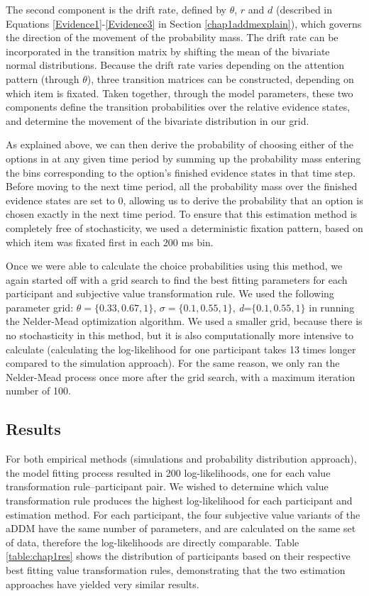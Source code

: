 \documentclass[11pt,a4paper]{article}
\begin{document}
The second component is the drift rate, defined by $\theta$, $r$ and $d$ (described in Equations \ref{Evidence1}-\ref{Evidence3} in Section \ref{chap1addmexplain}), which governs the direction of the movement of the probability mass. The drift rate can be incorporated in the transition matrix by shifting the mean of the bivariate normal distributions. Because the drift rate varies depending on the attention pattern (through $\theta$), three transition matrices can be constructed, depending on which item is fixated. Taken together, through the model parameters, these two components define the transition probabilities over the relative evidence states, and determine the movement of the bivariate distribution in our grid.  


As explained above, we can then derive the probability of choosing either of the options in at any given time period by summing up the probability mass entering the bins corresponding to the option's finished evidence states in that time step. Before moving to the next time period, all the probability mass over the finished evidence states are set to 0, allowing us to derive the probability that an option is chosen exactly in the next time period. To ensure that this estimation method is completely free of stochasticity, we used a deterministic fixation pattern, based on which item was fixated first in each 200 ms bin. 




Once we were able to calculate the choice probabilities using this method, we again started off with a grid search to find the best fitting parameters for each participant and subjective value transformation rule. We used the following parameter grid: $\theta=\{0.33, 0.67, 1\}$, $\sigma=\{0.1, 0.55, 1\}$, \textit{d}=$\{0.1, 0.55, 1\}$ in running the Nelder-Mead optimization algorithm. We used a smaller grid, because there is no stochasticity in this method, but it is also computationally more intensive to calculate (calculating the log-likelihood for one participant takes 13 times longer compared to the simulation approach). For the same reason, we only ran the Nelder-Mead process once more after the grid search, with a maximum iteration number of 100.  



\subsection{Results}

For both empirical methods (simulations and probability distribution approach), the model fitting process resulted in 200 log-likelihoods, one for each value transformation rule--participant pair. We wished to determine which value transformation rule produces the highest log-likelihood for each participant and estimation method. For each participant, the four subjective value variants of the aDDM have the same number of parameters, and are calculated on the same set of data, therefore the log-likelihoods are directly comparable. Table \ref{table:chap1res} shows the distribution of participants based on their respective best fitting value transformation rules, demonstrating that the two estimation approaches have yielded very similar results.
 
\end{document}
